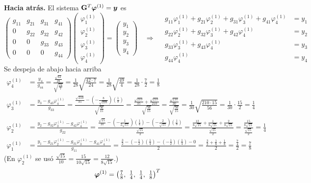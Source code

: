 \textbf{Hacia atrás.} El sistema $\mathbf{G}^T\bm{\varphi}^{(1)} = \bm{y}$ es
\[
\begin{pmatrix}
	g_{11} & g_{21} & g_{31} & g_{41}\\
	0 & g_{22} & g_{32} & g_{42}\\
	0 & 0 & g_{33} & g_{43}\\
	0 & 0 & 0 & g_{44}
\end{pmatrix}
\begin{pmatrix} \varphi_1^{(1)}\\ \varphi_2^{(1)}\\ \varphi_3^{(1)}\\ \varphi_4^{(1)} \end{pmatrix}
=
\begin{pmatrix} y_1\\ y_2\\ y_3\\ y_4 \end{pmatrix}
\quad\Longrightarrow\quad
\begin{aligned}
	g_{11}\varphi_1^{(1)} + g_{21}\varphi_2^{(1)} + g_{31}\varphi_3^{(1)} + g_{41}\varphi_4^{(1)} &= y_1\\
	g_{22}\varphi_2^{(1)} + g_{32}\varphi_3^{(1)} + g_{42}\varphi_4^{(1)} &= y_2\\
	g_{33}\varphi_3^{(1)} + g_{43}\varphi_4^{(1)} &= y_3\\
	g_{44}\varphi_4^{(1)} &= y_4
\end{aligned}
\]
Se despeja de abajo hacia arriba
\begin{align*}
	\varphi_4^{(1)} &= \frac{y_4}{g_{44}} = \frac{\tfrac{\sqrt{42}}{28}}{\sqrt{\tfrac{24}{7}}}
	= \frac{1}{28}\sqrt{\frac{42\cdot 7}{24}} = \frac{1}{28}\sqrt{\frac{49}{4}} = \frac{1}{28}\cdot\frac72 = \frac18\\[8pt]
	\varphi_3^{(1)} &= \frac{y_3 - g_{43}\varphi_4^{(1)}}{g_{33}}
	= \frac{\tfrac{\sqrt{210}}{35} - \left(-\tfrac{8}{\sqrt{210}}\right)\left(\tfrac18\right)}{\sqrt{\tfrac{56}{15}}}
	= \frac{\tfrac{\sqrt{210}}{35} + \tfrac{\sqrt{210}}{210}}{\sqrt{\tfrac{56}{15}}}
	= \frac{\tfrac{\sqrt{210}}{30}}{\sqrt{\tfrac{56}{15}}} = \frac{1}{30}\sqrt{\frac{210\cdot15}{56}} = \frac{1}{30}\cdot\frac{15}{2} = \frac14\\[8pt]
	\varphi_2^{(1)} &= \frac{y_2 - g_{32}\varphi_3^{(1)} - g_{42}\varphi_4^{(1)}}{g_{22}}
	= \frac{\tfrac{\sqrt{15}}{10} - \left(-\tfrac{1}{2\sqrt{15}}\right)\left(\tfrac14\right) - \left(-\tfrac{2}{\sqrt{15}}\right)\left(\tfrac18\right)}{\tfrac{\sqrt{15}}{2}}
	= \frac{\tfrac{12}{8\sqrt{15}} + \tfrac{1}{8\sqrt{15}} + \tfrac{2}{8\sqrt{15}}}{\tfrac{\sqrt{15}}{2}}
	= \frac{\tfrac{15}{8\sqrt{15}}}{\tfrac{\sqrt{15}}{2}} = \frac14\\[8pt]
	\varphi_1^{(1)} &= \frac{y_1 - g_{21}\varphi_2^{(1)} - g_{31}\varphi_3^{(1)} - g_{41}\varphi_4^{(1)}}{g_{11}}
	= \frac{\tfrac32 - \left(-\tfrac12\right)\left(\tfrac14\right) - \left(-\tfrac12\right)\left(\tfrac14\right) - 0}{2}
	= \frac{\tfrac32 + \tfrac18 + \tfrac18}{2} = \frac{\tfrac74}{2} = \frac78
\end{align*}
(En $\varphi_2^{(1)}$ se usó $\tfrac{\sqrt{15}}{10} = \tfrac{15}{10\sqrt{15}} = \tfrac{12}{8\sqrt{15}}$.)
\[
\vect{\varphi}^{(1)} = \left(\tfrac78,\ \tfrac14,\ \tfrac14,\ \tfrac18\right)^T
\]

